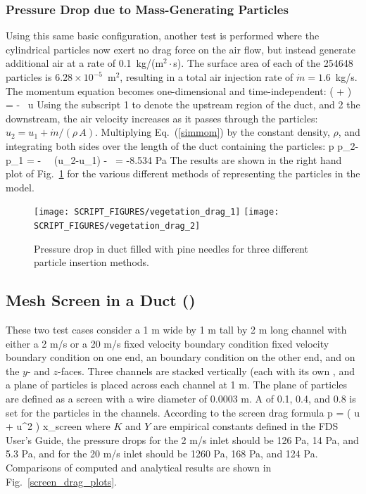 \documentclass[11pt]{book}
\begin{document}
\subsubsection{Pressure Drop due to Mass-Generating Particles}

Using this same basic configuration, another test is performed where the cylindrical particles now exert no drag force on the air flow, but instead generate additional air at a rate of 0.1~kg/(m$^2 \cdot$s). The surface area of each of the 254648 particles is $6.28 \times 10^{-5}$~m$^2$, resulting in a total air injection rate of $\dot{m}=1.6$~kg/s. The momentum equation becomes one-dimensional and time-independent:
\be
    \left(  +  \right) = -   \, u  \label{simmom}
\ee
Using the subscript 1 to denote the upstream region of the duct, and 2 the downstream, the air velocity increases as it passes through the particles: $u_2=u_1+\dot{m}/(\rho \, A)$. Multiplying Eq.~(\ref{simmom}) by the constant density, $\rho$, and integrating both sides over the length of the duct containing the particles:
\be
   \Delta p \equiv p_2-p_1 =  - \rho \,  \, (u_2-u_1) -  \,  = -8.534  \; {\rm Pa}
\ee
The results are shown in the right hand plot of Fig.~\ref{vegetation_drag_fig} for the various different methods of representing the particles in the model.

\begin{figure}[ht]
\texttt{[image: SCRIPT\_FIGURES/vegetation\_drag\_1]}
\texttt{[image: SCRIPT\_FIGURES/vegetation\_drag\_2]}
\caption[The {\ct vegetation\_drag} test cases]{Pressure drop in duct filled with pine needles for three different particle insertion methods.}
\label{vegetation_drag_fig}
\end{figure}



\subsection{Mesh Screen in a Duct (\texorpdfstring{}{screen\_drag})}
\label{screen_drag_1}
\label{screen_drag_2}

These two test cases consider a 1 m wide by 1 m tall by 2 m long channel with either a 2 m/s or a 20 m/s fixed velocity boundary condition fixed velocity boundary condition on one end, an  boundary condition on the other end, and  on the $y$- and $z$-faces.  Three channels are stacked vertically (each with its own , and a plane of particles is placed across each channel at 1 m.  The plane of particles are defined as a screen with a wire diameter of 0.0003 m.  A  of 0.1, 0.4, and 0.8 is set for the particles in the channels.  According to the screen drag formula
\be
   \Delta p \;= \; \left(  u \; + \; \rho {} u^2 \right) \Delta x_{\rm screen}
\ee
where $K$ and $Y$ are empirical constants defined in the FDS User's Guide, the pressure drops for the 2 m/s inlet should be 126 Pa, 14 Pa, and 5.3 Pa, and for the 20 m/s inlet should be 1260 Pa, 168 Pa, and 124 Pa.   Comparisons of computed and analytical results are shown in Fig.~\ref{screen_drag_plots}.
\end{document}
